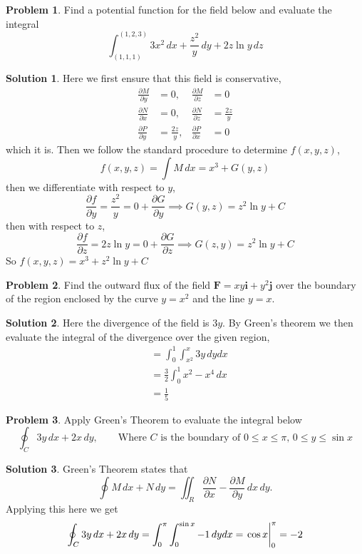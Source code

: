 \documentclass[10pt]{article}
\theoremstyle{definition}
\newtheorem{problem}{Problem}
\newtheorem{soln}{Solution}
\newcommand{\ui}{\mathbf{i}}
\newcommand{\uj}{\mathbf{j}}
\begin{document}
\begin{problem}
Find a potential function for the field below and evaluate the integral
$$\int_{(1,1,1)}^{(1,2,3)}3x^2\,dx+\frac{z^2}{y}\,dy+2z\ln y\,dz$$
\end{problem}
\begin{soln}
  Here we first ensure that this field is conservative,
  \begin{align*}
    \frac{\partial M}{\partial y} & =0,
                                  & \frac{\partial M}{\partial z} & =0            \\
    \frac{\partial N}{\partial x} & =0,
                                  & \frac{\partial N}{\partial z} & =\frac{2z}{y} \\
    \frac{\partial P}{\partial y} & =\frac{2z}{y},
                                  & \frac{\partial P}{\partial x} & =0
  \end{align*}
  which it is. Then we follow the standard procedure to determine $f(x,y,z)$,
  $$f(x,y,z)=\int M\,dx=x^3+G(y,z)$$
  then we differentiate with respect to $y$,
  $$\frac{\partial f}{\partial y}=\frac{z^2}{y}=0+\frac{\partial G}{\partial y}
    \implies G(y,z)=z^2\ln y+C$$
  then with respect to $z$,
  $$\frac{\partial f}{\partial z}=2z\ln y=0+\frac{\partial G}{\partial z}
    \implies G(z,y)=z^2\ln y + C$$
  So $f(x,y,z)=x^3+z^2\ln y + C$
\end{soln}

\begin{problem}
Find the outward flux of the field $\mathbf{F} = xy\ui + y^2\uj$ over the boundary of the region enclosed by
the curve $y = x^2$ and the line $y = x$.
\end{problem}
\begin{soln}
  Here the divergence of the field is $3y$. By Green's theorem we then evaluate the integral of the divergence over the given region,
  \begin{align*}
     & =\int_{0}^{1}\int_{x^2}^{x}3y\,dydx \\
     & =\frac{3}{2}\int_{0}^{1}x^2-x^4\,dx \\
     & =\frac{1}{5}
  \end{align*}
\end{soln}

\begin{problem}
Apply Green's Theorem to evaluate the integral below
$$\oint_C 3y\,dx+2x\,dy,\qquad\text{Where $C$ is the boundary of } 0\leq x\leq\pi,\,0\leq y\leq \sin x$$
\end{problem}
\begin{soln}
  Green's Theorem states that $$\oint M\,dx+N\,dy=\iint_R\frac{\partial N}{\partial x}-\frac{\partial M}{\partial y}\,dx\,dy.$$
  Applying this here we get
  $$\oint_C 3y\,dx+2x\,dy=\int_0^\pi\int_{0}^{\sin x}-1\,dydx=\eval{\cos x}_{0}^{\pi}=-2$$
\end{soln}
\end{document}
